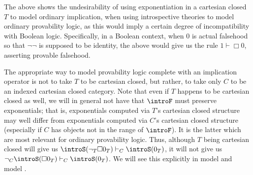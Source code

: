 The above shows the undesirability of using exponentiation in a cartesian closed $T$ to model ordinary implication, when using introspective theories to model ordinary provability logic, as this would imply a certain degree of incompatibility with Boolean logic. Specifically, in a Boolean context, when $0$ is actual falsehood so that $\neg \neg$ is supposed to be identity, the above would give us the rule $1 \vdash \Box 0$, asserting provable falsehood.

The appropriate way to model provability logic complete with an implication operator is not to take $T$ to be cartesian closed, but rather, to take only $C$ to be an indexed cartesian closed category. Note that even if $T$ happens to be cartesian closed as well, we will in general not have that $\introF$ must preserve exponentials; that is, exponentials computed via $T$'s cartesian closed structure may well differ from exponentials computed via $C$'s cartesian closed structure (especially  if $C$ has objects not in the range of $\introF$). It is the latter which are most relevant for ordinary provability logic. Thus, although $T$ being cartesian closed will give us $\introS(\neg_T \Box 0_T) \vdash_C \introS(0_T)$, it will not give us $\neg_C \introS(\Box 0_T) \vdash_C \introS(0_T)$. We will see this explicitly in model \TODO and model \TODO.

